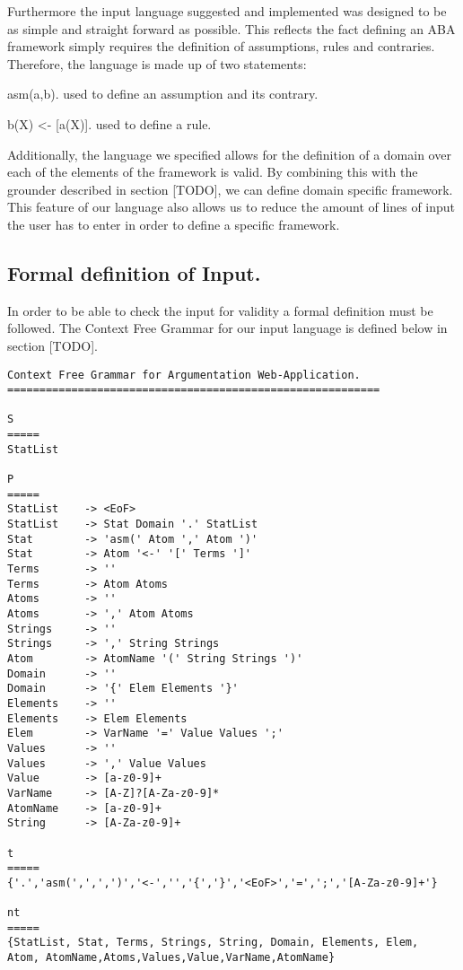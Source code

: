 Furthermore the input language suggested and implemented was designed to be as simple and straight forward as possible. This reflects the fact defining an ABA framework simply requires the definition of assumptions, rules and contraries. Therefore, the language is made up of two statements:

\begin{itemize*}
\item asm(a,b). used to define an assumption and its contrary.
\item b(X) \textless - [a(X)]. used to define a rule.
\end{itemize*}

Additionally, the language we specified allows for the definition of a domain over each of the elements of the framework is valid. By combining this with the grounder described in section [TODO], we can define domain specific framework. This feature of our language also allows us to reduce the amount of lines of input the user has to enter in order to define a specific framework.


\subsection{Formal definition of Input.}

In order to be able to check the input for validity a formal definition must be followed. The Context Free Grammar for our input language is defined below in section [TODO].

\begin{verbatim}
Context Free Grammar for Argumentation Web-Application.
==========================================================

S 
=====
StatList

P
=====
StatList	-> <EoF>
StatList	-> Stat Domain '.' StatList
Stat		-> 'asm(' Atom ',' Atom ')'
Stat		-> Atom '<-' '[' Terms ']'
Terms		-> ''
Terms		-> Atom Atoms
Atoms		-> ''
Atoms		-> ',' Atom Atoms
Strings		-> ''
Strings		-> ',' String Strings
Atom		-> AtomName '(' String Strings ')'
Domain		-> ''
Domain		-> '{' Elem Elements '}'
Elements	-> ''
Elements	-> Elem Elements
Elem		-> VarName '=' Value Values ';'
Values		-> ''
Values		-> ',' Value Values
Value		-> [a-z0-9]+
VarName		-> [A-Z]?[A-Za-z0-9]*
AtomName	-> [a-z0-9]+
String		-> [A-Za-z0-9]+

t
=====
{'.','asm(',',',')','<-','','{','}','<EoF>','=',';','[A-Za-z0-9]+'}

nt
=====
{StatList, Stat, Terms, Strings, String, Domain, Elements, Elem,
Atom, AtomName,Atoms,Values,Value,VarName,AtomName}
\end{verbatim}

